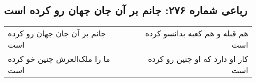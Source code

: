 \begin{center}
\section*{رباعی شماره ۲۷۶: جانم بر آن جان جهان رو کرده است}
\label{sec:0276}
\begin{longtable}{l p{0.5cm} r}
جانم بر آن جان جهان رو کرده است
&&
هم قبله و هم کعبه بدانسو کرده است
\\
ما را ملک‌العرش چنین خو کرده است
&&
کار او دارد که او چنین رو کرده است
\\
\end{longtable}
\end{center}
